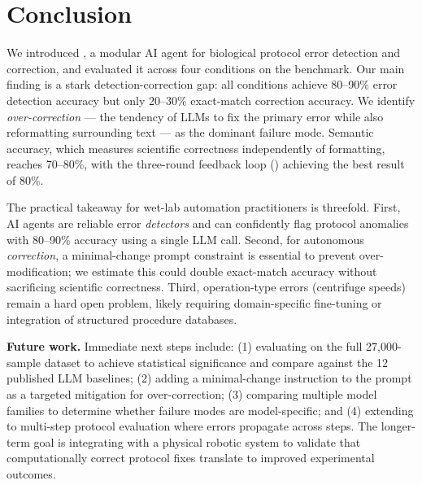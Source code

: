 \section{Conclusion}
\label{sec:conclusion}

We introduced \wetlabagent, a modular AI agent for biological protocol error detection and correction, and evaluated it across four conditions on the \bioprobench benchmark.
Our main finding is a stark detection-correction gap: all conditions achieve 80--90\% error detection accuracy but only 20--30\% exact-match correction accuracy.
We identify \emph{over-correction} --- the tendency of LLMs to fix the primary error while also reformatting surrounding text --- as the dominant failure mode.
Semantic accuracy, which measures scientific correctness independently of formatting, reaches 70--80\%, with the three-round feedback loop (\feedbackthree) achieving the best result of 80\%.

The practical takeaway for wet-lab automation practitioners is threefold.
First, AI agents are reliable error \emph{detectors} and can confidently flag protocol anomalies with 80--90\% accuracy using a single LLM call.
Second, for autonomous \emph{correction}, a minimal-change prompt constraint is essential to prevent over-modification; we estimate this could double exact-match accuracy without sacrificing scientific correctness.
Third, operation-type errors (\eg centrifuge speeds) remain a hard open problem, likely requiring domain-specific fine-tuning or integration of structured procedure databases.

{\bf Future work.}
Immediate next steps include: (1) evaluating on the full 27,000-sample \bioprobench dataset to achieve statistical significance and compare against the 12 published LLM baselines; (2) adding a minimal-change instruction to the prompt as a targeted mitigation for over-correction; (3) comparing multiple model families to determine whether failure modes are model-specific; and (4) extending to multi-step protocol evaluation where errors propagate across steps.
The longer-term goal is integrating \wetlabagent with a physical robotic system to validate that computationally correct protocol fixes translate to improved experimental outcomes.
